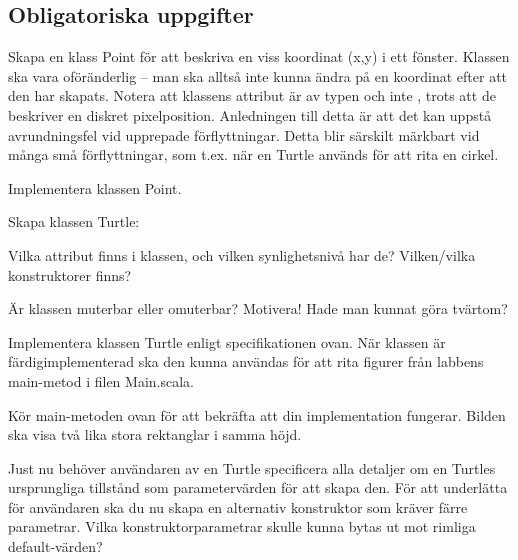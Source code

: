 \clearpage

\subsection{Obligatoriska uppgifter}

\Task Skapa en klass Point för att beskriva en viss koordinat (x,y) i ett fönster. Klassen ska vara oföränderlig -- man ska alltså inte kunna ändra på en koordinat efter att den har skapats. Notera att klassens attribut är av typen  och inte , trots att de beskriver en diskret pixelposition. Anledningen till detta är att det kan uppstå avrundningsfel vid upprepade förflyttningar. Detta blir särskilt märkbart vid många små förflyttningar, som t.ex. när en Turtle används för att rita en cirkel.


\Subtask Implementera klassen Point.

\Task Skapa klassen Turtle:

\vspace{1em} %


\Subtask Vilka attribut finns i klassen, och vilken synlighetsnivå har de? Vilken/vilka konstruktorer finns?

\Subtask Är klassen muterbar eller omuterbar? Motivera! Hade man kunnat göra tvärtom?

\Subtask Implementera klassen Turtle enligt specifikationen ovan. När klassen är färdigimplementerad ska den kunna användas för att rita figurer från labbens main-metod i filen Main.scala.


\Subtask Kör main-metoden ovan för att bekräfta att din implementation fungerar. Bilden ska visa två lika stora rektanglar i samma höjd.

\Subtask Just nu behöver användaren av en Turtle specificera alla detaljer om en Turtles ursprungliga tillstånd som parametervärden för att skapa den. För att underlätta för användaren ska du nu skapa en alternativ konstruktor som kräver färre parametrar. Vilka konstruktorparametrar skulle kunna bytas ut mot rimliga default-värden?

